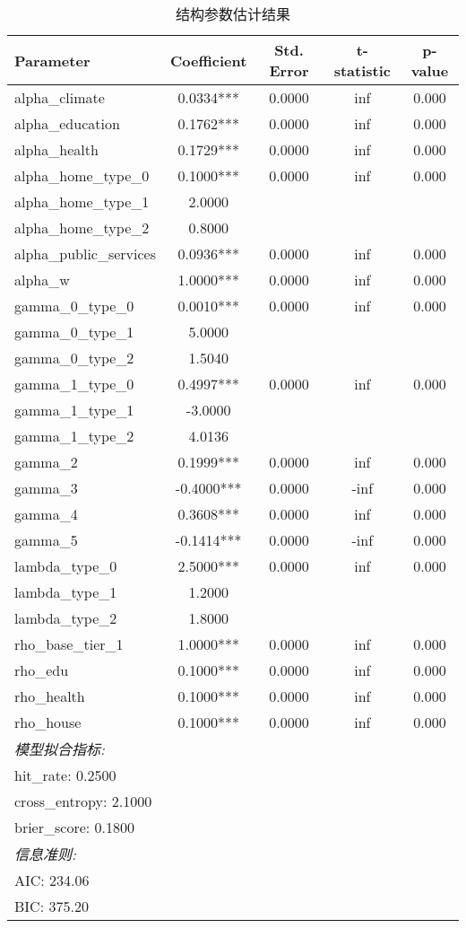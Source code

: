 \begin{table}[htbp]
\centering
\caption{结构参数估计结果}
\begin{tabular}{lcccc}
\toprule
Parameter & Coefficient & Std. Error & t-statistic & p-value \\
\midrule
alpha_climate & 0.0334*** & 0.0000 & inf & 0.000 \\
alpha_education & 0.1762*** & 0.0000 & inf & 0.000 \\
alpha_health & 0.1729*** & 0.0000 & inf & 0.000 \\
alpha_home_type_0 & 0.1000*** & 0.0000 & inf & 0.000 \\
alpha_home_type_1 & 2.0000 &  &  &  \\
alpha_home_type_2 & 0.8000 &  &  &  \\
alpha_public_services & 0.0936*** & 0.0000 & inf & 0.000 \\
alpha_w & 1.0000*** & 0.0000 & inf & 0.000 \\
gamma_0_type_0 & 0.0010*** & 0.0000 & inf & 0.000 \\
gamma_0_type_1 & 5.0000 &  &  &  \\
gamma_0_type_2 & 1.5040 &  &  &  \\
gamma_1_type_0 & 0.4997*** & 0.0000 & inf & 0.000 \\
gamma_1_type_1 & -3.0000 &  &  &  \\
gamma_1_type_2 & 4.0136 &  &  &  \\
gamma_2 & 0.1999*** & 0.0000 & inf & 0.000 \\
gamma_3 & -0.4000*** & 0.0000 & -inf & 0.000 \\
gamma_4 & 0.3608*** & 0.0000 & inf & 0.000 \\
gamma_5 & -0.1414*** & 0.0000 & -inf & 0.000 \\
lambda_type_0 & 2.5000*** & 0.0000 & inf & 0.000 \\
lambda_type_1 & 1.2000 &  &  &  \\
lambda_type_2 & 1.8000 &  &  &  \\
rho_base_tier_1 & 1.0000*** & 0.0000 & inf & 0.000 \\
rho_edu & 0.1000*** & 0.0000 & inf & 0.000 \\
rho_health & 0.1000*** & 0.0000 & inf & 0.000 \\
rho_house & 0.1000*** & 0.0000 & inf & 0.000 \\
\midrule
\multicolumn{5}{l}{\textit{模型拟合指标:}} \\
\multicolumn{5}{l}{\quad hit_rate: 0.2500} \\
\multicolumn{5}{l}{\quad cross_entropy: 2.1000} \\
\multicolumn{5}{l}{\quad brier_score: 0.1800} \\
\multicolumn{5}{l}{\textit{信息准则:}} \\
\multicolumn{5}{l}{\quad AIC: 234.06} \\
\multicolumn{5}{l}{\quad BIC: 375.20} \\
\bottomrule
\end{tabular}
\end{table}
